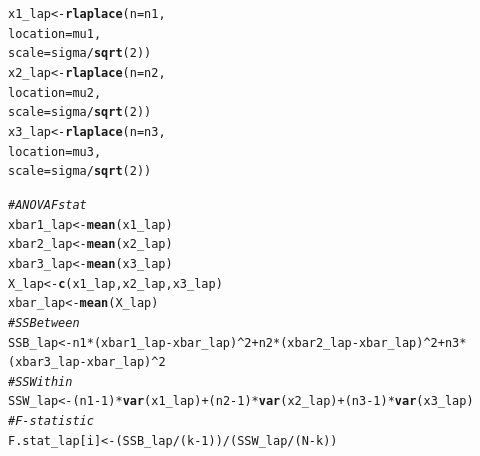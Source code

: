 \documentclass{article}\usepackage[]{graphicx}\usepackage[]{xcolor}
\makeatletter
\newcommand{\hlnum}[1]{\textcolor[rgb]{0.686,0.059,0.569}{#1}}%
\newcommand{\hlcom}[1]{\textcolor[rgb]{0.678,0.584,0.686}{\textit{#1}}}%
\newcommand{\hlopt}[1]{\textcolor[rgb]{0,0,0}{#1}}%
\newcommand{\hldef}[1]{\textcolor[rgb]{0.345,0.345,0.345}{#1}}%
\newcommand{\hlkwb}[1]{\textcolor[rgb]{0.69,0.353,0.396}{#1}}%
\newcommand{\hlkwc}[1]{\textcolor[rgb]{0.333,0.667,0.333}{#1}}%
\newcommand{\hlkwd}[1]{\textcolor[rgb]{0.737,0.353,0.396}{\textbf{#1}}}%
\newenvironment{kframe}{%
 \def\at@end@of@kframe{}%
 \ifinner\ifhmode%
  \def\at@end@of@kframe{\end{minipage}}%
  \begin{minipage}{\columnwidth}%
 \fi\fi%
 \def\FrameCommand##1{\hskip\@totalleftmargin \hskip-\fboxsep
 \colorbox{shadecolor}{##1}\hskip-\fboxsep
     \hskip-\linewidth \hskip-\@totalleftmargin \hskip\columnwidth}%
 \MakeFramed {\advance\hsize-\width
   \@totalleftmargin\z@ \linewidth\hsize
   \@setminipage}}%
 {\par\unskip\endMakeFramed%
 \at@end@of@kframe}
\newenvironment{knitrout}{}{} %
\makeatother
\begin{document}
\begin{enumerate}
\begin{enumerate}
\begin{knitrout}
\begin{kframe}
\begin{alltt}
\hldef{x1_lap} \hlkwb{<-} \hlkwd{rlaplace}\hldef{(}\hlkwc{n} \hldef{= n1,}
                   \hlkwc{location} \hldef{= mu1,}
                   \hlkwc{scale} \hldef{= sigma}\hlopt{/}\hlkwd{sqrt}\hldef{(}\hlnum{2}\hldef{))}
\hldef{x2_lap} \hlkwb{<-} \hlkwd{rlaplace}\hldef{(}\hlkwc{n} \hldef{= n2,}
                   \hlkwc{location} \hldef{= mu2,}
                   \hlkwc{scale} \hldef{= sigma}\hlopt{/}\hlkwd{sqrt}\hldef{(}\hlnum{2}\hldef{))}
\hldef{x3_lap} \hlkwb{<-} \hlkwd{rlaplace}\hldef{(}\hlkwc{n} \hldef{= n3,}
                   \hlkwc{location} \hldef{= mu3,}
                   \hlkwc{scale} \hldef{= sigma}\hlopt{/}\hlkwd{sqrt}\hldef{(}\hlnum{2}\hldef{))}

  \hlcom{# ANOVA F stat}
  \hldef{xbar1_lap} \hlkwb{<-} \hlkwd{mean}\hldef{(x1_lap)}
  \hldef{xbar2_lap} \hlkwb{<-} \hlkwd{mean}\hldef{(x2_lap)}
  \hldef{xbar3_lap} \hlkwb{<-} \hlkwd{mean}\hldef{(x3_lap)}
  \hldef{X_lap} \hlkwb{<-} \hlkwd{c}\hldef{(x1_lap, x2_lap, x3_lap)}
  \hldef{xbar_lap} \hlkwb{<-} \hlkwd{mean}\hldef{(X_lap)}
  \hlcom{# SSBetween}
  \hldef{SSB_lap} \hlkwb{<-} \hldef{n1}\hlopt{*}\hldef{(xbar1_lap}\hlopt{-}\hldef{xbar_lap)}\hlopt{^}\hlnum{2} \hlopt{+} \hldef{n2}\hlopt{*}\hldef{(xbar2_lap}\hlopt{-}\hldef{xbar_lap)}\hlopt{^}\hlnum{2} \hlopt{+} \hldef{n3}\hlopt{*}\hldef{(xbar3_lap}\hlopt{-}\hldef{xbar_lap)}\hlopt{^}\hlnum{2}
  \hlcom{# SSWithin}
  \hldef{SSW_lap} \hlkwb{<-} \hldef{(n1}\hlopt{-}\hlnum{1}\hldef{)}\hlopt{*}\hlkwd{var}\hldef{(x1_lap)} \hlopt{+} \hldef{(n2}\hlopt{-}\hlnum{1}\hldef{)}\hlopt{*}\hlkwd{var}\hldef{(x2_lap)} \hlopt{+} \hldef{(n3}\hlopt{-}\hlnum{1}\hldef{)}\hlopt{*}\hlkwd{var}\hldef{(x3_lap)}
  \hlcom{# F-statistic}
  \hldef{F.stat_lap[i]} \hlkwb{<-} \hldef{(SSB_lap}\hlopt{/}\hldef{(k}\hlopt{-}\hlnum{1}\hldef{))}\hlopt{/}\hldef{(SSW_lap}\hlopt{/}\hldef{(N}\hlopt{-}\hldef{k))}


\end{alltt}
\end{kframe}
\end{knitrout}
\end{enumerate}
\end{enumerate}
\end{document}
